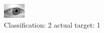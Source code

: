 \begin{figure}[h!]
\begin{center}
\includegraphics[width=0.60\columnwidth]{figures/ID2762_class_2_target_1.png}
\end{center}
\caption{ Classification: 2 actual target: 1}
\label{fig:ID2762_class_2_target_1}
\end{figure}
